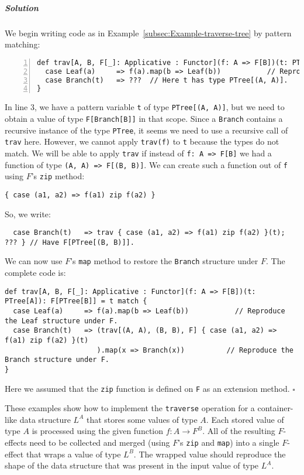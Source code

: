 \subparagraph{Solution}

We begin writing code as in Example~\ref{subsec:Example-traverse-tree}
by pattern matching:
\begin{lstlisting}[numbers=left]
def trav[A, B, F[_]: Applicative : Functor](f: A => F[B])(t: PTree[A]): F[PTree[B]] = t match {
  case Leaf(a)     => f(a).map(b => Leaf(b))           // Reproduce the Leaf structure under F.
  case Branch(t)   => ???  // Here t has type PTree[(A, A)].
}
\end{lstlisting}
In line 3, we have a pattern variable \lstinline!t! of type \lstinline!PTree[(A, A)]!,
but we need to obtain a value of type \lstinline!F[Branch[B]]! in
that scope. Since a \lstinline!Branch! contains a recursive instance
of the type \lstinline!PTree!, it seems we need to use a recursive
call of \lstinline!trav! here. However, we cannot apply \lstinline!trav(f)!
to \lstinline!t! because the types do not match. We will be able
to apply \lstinline!trav! if instead of \lstinline!f: A => F[B]!
we had a function of type \lstinline!(A, A) => F[(B, B)]!. We can
create such a function out of \lstinline!f! using $F$\textsf{'}s \lstinline!zip!
method:
\begin{lstlisting}
{ case (a1, a2) => f(a1) zip f(a2) }
\end{lstlisting}
 So, we write:
\begin{lstlisting}
  case Branch(t)   => trav { case (a1, a2) => f(a1) zip f(a2) }(t); ??? } // Have F[PTree[(B, B)]].
\end{lstlisting}
We can now use $F$\textsf{'}s \lstinline!map! method to restore the \lstinline!Branch!
structure under $F$. The complete code is:
\begin{lstlisting}
def trav[A, B, F[_]: Applicative : Functor](f: A => F[B])(t: PTree[A]): F[PTree[B]] = t match {
  case Leaf(a)     => f(a).map(b => Leaf(b))           // Reproduce the Leaf structure under F.
  case Branch(t)   => (trav[(A, A), (B, B), F] { case (a1, a2) => f(a1) zip f(a2) }(t)
                      ).map(x => Branch(x))          // Reproduce the Branch structure under F.
}
\end{lstlisting}
Here we assumed that the \lstinline!zip! function is defined on \lstinline!F!
as an extension method. $\square$

These examples show how to implement the \lstinline!traverse! operation
for a container-like data structure $L^{A}$ that stores some values
of type $A$. Each stored value of type $A$ is processed using the
given function $f:A\rightarrow F^{B}$. All of the resulting $F$-effects
need to be collected and merged (using $F$\textsf{'}s \lstinline!zip! and
\lstinline!map!) into a single $F$-effect that wraps a value of
type $L^{B}$. The wrapped value should reproduce the shape of the
data structure that was present in the input value of type $L^{A}$. 


